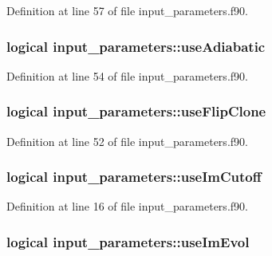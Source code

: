 Definition at line 57 of file input\_\-parameters.f90.

\hypertarget{namespaceinput__parameters_ac1165234d614ad278effaf2a7910888b}{
\subsubsection[{useAdiabatic}]{\setlength{\rightskip}{0pt plus 5cm}logical {\bf input\_\-parameters::useAdiabatic}}}
\label{namespaceinput__parameters_ac1165234d614ad278effaf2a7910888b}


Definition at line 54 of file input\_\-parameters.f90.

\hypertarget{namespaceinput__parameters_a504b6e2c93e4a4af47125d83d6e5d75d}{
\subsubsection[{useFlipClone}]{\setlength{\rightskip}{0pt plus 5cm}logical {\bf input\_\-parameters::useFlipClone}}}
\label{namespaceinput__parameters_a504b6e2c93e4a4af47125d83d6e5d75d}


Definition at line 52 of file input\_\-parameters.f90.

\hypertarget{namespaceinput__parameters_aa73f50863135132e72d9a9c93d2cadef}{
\subsubsection[{useImCutoff}]{\setlength{\rightskip}{0pt plus 5cm}logical {\bf input\_\-parameters::useImCutoff}}}
\label{namespaceinput__parameters_aa73f50863135132e72d9a9c93d2cadef}


Definition at line 16 of file input\_\-parameters.f90.

\hypertarget{namespaceinput__parameters_a9672a1c90e65a2ecee350dd2dae64e03}{
\subsubsection[{useImEvol}]{\setlength{\rightskip}{0pt plus 5cm}logical {\bf input\_\-parameters::useImEvol}}}
\label{namespaceinput__parameters_a9672a1c90e65a2ecee350dd2dae64e03}


